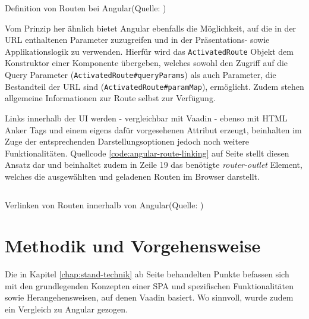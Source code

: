 \documentclass[a4paper,12pt,twoside]{scrreprt}
\begin{document}
\begin{listing}[ht]
    \inputminted[fontsize=\footnotesize,linenos]{js}{code/Angular_routes_definition.js}
    \caption[Definition von Routen bei Angular]{Definition von Routen bei Angular\newline(Quelle: \cite[][]{google_llc_angular_nodate})}
    \label{code:angular-route-definition}
\end{listing}

Vom Prinzip her ähnlich bietet Angular ebenfalls die Möglichkeit, auf die in der URL enthaltenen Parameter zuzugreifen und in der Präsentations- sowie Applikationslogik zu verwenden. Hierfür wird das \texttt{ActivatedRoute} Objekt dem Konstruktor einer Komponente übergeben, welches sowohl den Zugriff auf die Query Parameter (\texttt{ActivatedRoute\#queryParams}) als auch Parameter, die Bestandteil der URL sind (\texttt{ActivatedRoute\#paramMap}), ermöglicht. Zudem stehen allgemeine Informationen zur Route selbst zur Verfügung. \parencite[][]{google_llc_angular_nodate}

\medskip

Links innerhalb der \acs{UI} werden - vergleichbar mit Vaadin - ebenso mit HTML Anker Tags und einem eigens dafür vorgesehenen Attribut erzeugt, beinhalten im Zuge der entsprechenden Darstellungsoptionen jedoch noch weitere Funktionalitäten. Quellcode \ref{code:angular-route-linking} auf Seite \pageref{code:angular-route-linking} stellt diesen Ansatz dar und beinhaltet zudem in Zeile 19 das benötigte \textit{router-outlet} Element, welches die ausgewählten und geladenen Routen im Browser darstellt. \parencite[][]{google_llc_angular_nodate}

\begin{listing}[ht]
    \inputminted[fontsize=\footnotesize,linenos]{html}{code/Angular_anker_tags_routing.html}
    \caption[Verlinken von Routen innerhalb von Angular]{Verlinken von Routen innerhalb von Angular\newline(Quelle: \cite[][]{google_llc_angular_nodate})}
    \label{code:angular-route-linking}
\end{listing}

\chapter{Methodik und Vorgehensweise}
\label{chap:methodik-Vorgehensweise}
Die in Kapitel \ref{chap:stand-technik} ab Seite \pageref{chap:stand-technik} behandelten Punkte befassen sich mit den grundlegenden Konzepten einer \ac{SPA} und spezifischen Funktionalitäten sowie Herangehensweisen, auf denen Vaadin basiert. Wo sinnvoll, wurde zudem ein Vergleich zu Angular gezogen.
\end{document}
